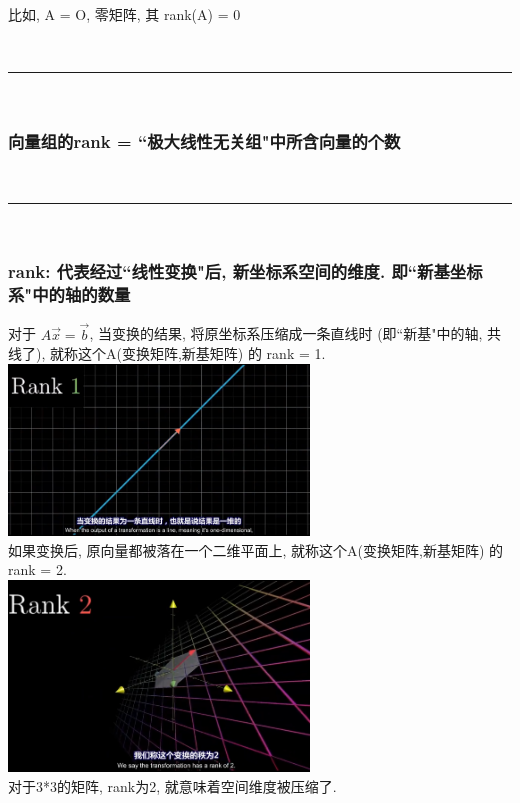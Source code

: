 \documentclass[UTF8]{ctexart}
\begin{document}
比如, A = O, 零矩阵, 其 rank(A) = 0
	
	
	
	
	~\\
	\hrule
	~\\
	
	
	\subsubsection{向量组的rank = ``极大线性无关组"中所含向量的个数}
	
	~\\
	\hrule
	~\\
	
	
	
\subsubsection{rank: 代表经过``线性变换"后, 新坐标系空间的维度. 即``新基坐标系"中的轴的数量}

对于 $ A\vec{x}=\vec{b}$, 当变换的结果, 将原坐标系压缩成一条直线时 (即``新基"中的轴, 共线了), 就称这个A(变换矩阵,新基矩阵) 的 rank = 1. \\
\includegraphics[width=0.6\textwidth]{img/0038.png}\\

如果变换后, 原向量都被落在一个二维平面上, 就称这个A(变换矩阵,新基矩阵) 的 rank = 2.  \\
\includegraphics[width=0.6\textwidth]{img/0039.png}\\

对于3*3的矩阵, rank为2, 就意味着空间维度被压缩了.\\
\end{document}
